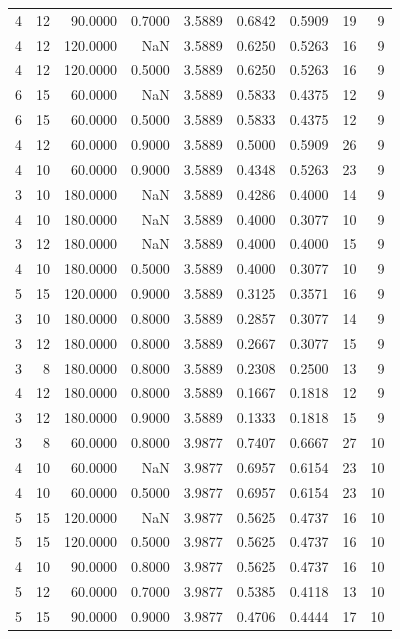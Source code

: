\begin{tabular}{rrrrrrrrr}
4 & 12 & 90.0000 & 0.7000 & 3.5889 & 0.6842 & 0.5909 & 19 & 9 \\
4 & 12 & 120.0000 & NaN & 3.5889 & 0.6250 & 0.5263 & 16 & 9 \\
4 & 12 & 120.0000 & 0.5000 & 3.5889 & 0.6250 & 0.5263 & 16 & 9 \\
6 & 15 & 60.0000 & NaN & 3.5889 & 0.5833 & 0.4375 & 12 & 9 \\
6 & 15 & 60.0000 & 0.5000 & 3.5889 & 0.5833 & 0.4375 & 12 & 9 \\
4 & 12 & 60.0000 & 0.9000 & 3.5889 & 0.5000 & 0.5909 & 26 & 9 \\
4 & 10 & 60.0000 & 0.9000 & 3.5889 & 0.4348 & 0.5263 & 23 & 9 \\
3 & 10 & 180.0000 & NaN & 3.5889 & 0.4286 & 0.4000 & 14 & 9 \\
4 & 10 & 180.0000 & NaN & 3.5889 & 0.4000 & 0.3077 & 10 & 9 \\
3 & 12 & 180.0000 & NaN & 3.5889 & 0.4000 & 0.4000 & 15 & 9 \\
4 & 10 & 180.0000 & 0.5000 & 3.5889 & 0.4000 & 0.3077 & 10 & 9 \\
5 & 15 & 120.0000 & 0.9000 & 3.5889 & 0.3125 & 0.3571 & 16 & 9 \\
3 & 10 & 180.0000 & 0.8000 & 3.5889 & 0.2857 & 0.3077 & 14 & 9 \\
3 & 12 & 180.0000 & 0.8000 & 3.5889 & 0.2667 & 0.3077 & 15 & 9 \\
3 & 8 & 180.0000 & 0.8000 & 3.5889 & 0.2308 & 0.2500 & 13 & 9 \\
4 & 12 & 180.0000 & 0.8000 & 3.5889 & 0.1667 & 0.1818 & 12 & 9 \\
3 & 12 & 180.0000 & 0.9000 & 3.5889 & 0.1333 & 0.1818 & 15 & 9 \\
3 & 8 & 60.0000 & 0.8000 & 3.9877 & 0.7407 & 0.6667 & 27 & 10 \\
4 & 10 & 60.0000 & NaN & 3.9877 & 0.6957 & 0.6154 & 23 & 10 \\
4 & 10 & 60.0000 & 0.5000 & 3.9877 & 0.6957 & 0.6154 & 23 & 10 \\
5 & 15 & 120.0000 & NaN & 3.9877 & 0.5625 & 0.4737 & 16 & 10 \\
5 & 15 & 120.0000 & 0.5000 & 3.9877 & 0.5625 & 0.4737 & 16 & 10 \\
4 & 10 & 90.0000 & 0.8000 & 3.9877 & 0.5625 & 0.4737 & 16 & 10 \\
5 & 12 & 60.0000 & 0.7000 & 3.9877 & 0.5385 & 0.4118 & 13 & 10 \\
5 & 15 & 90.0000 & 0.9000 & 3.9877 & 0.4706 & 0.4444 & 17 & 10 \\

\end{tabular}

